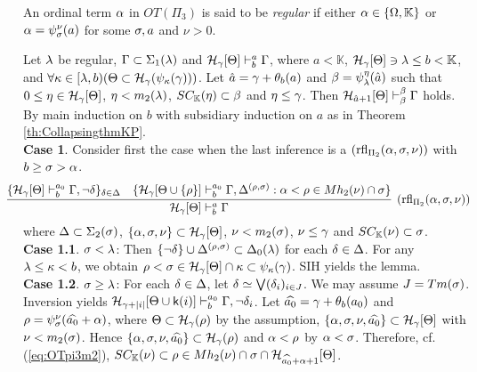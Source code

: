 \documentclass{article}
\newcommand{\mK}{\mathbb{K}}
\begin{document}
An ordinal term $\alpha$ in $OT(\Pi_{3})$ is said to be \textit{regular} if
either $\alp\in\{\Ome,\mK\}$ or $\alpha=\psi_{\sigma}^{\nu}(a)$ for some
$\sigma,a$ and $\nu>0$.



\blem\label{lem:lowerPi2}
Let $\lambda$ be regular, $\Gamma\subset\Sigma_{1}(\lambda)$ and
${\cal H}_{\gamma}[\Theta]\vdash^{a}_{b}\Gamma$, where $a<\mK$, 
$\calh_{\gam}[\Tht]\ni\lam\leq b<\mK$, and
$\forall\kappa\in[\lambda,b)(\Theta\subset{\cal H}_{\gamma}(\psi_{\kappa}(\gamma)))$.
Let $\hat{a}=\gamma+\theta_{b}(a)$ and $\beta=\psi^{\eta}_{\lambda}(\hat{a})$ such that
$0\leq\eta\in{\cal H}_{\gamma}[\Theta]$, $\eta<m_{2}(\lambda)$, $SC_{\mK}(\eta)\subset\bet$ and $\eta\leq\gamma$.
Then
${\cal H}_{\hat{a}+1}[\Theta]\vdash^{\beta}_{\beta}\Gamma$ holds.
\elem
\bprf 
By main induction on $b$ with subsidiary induction on $a$ as in Theorem \ref{th:CollapsingthmKP}.
\\
\textbf{Case 1}.
Consider first the case when the last inference is a 
$({\rm rfl}_{\Pi_{2}}(\alpha,\sigma,\nu))$ with $b\geq\sigma>\alpha$.
{\small
\[
\hspace{-5mm}
\infer[({\rm rfl}_{\Pi_{2}}(\alp,\sig,\nu))]{
\calh_{\gam}[\Tht]\vdash^{a}_{b}\Gam}
{
\{
\mathcal{H}_{\gam}[\Tht]\vdash^{a_{0}}_{b}\Gamma, \lnot\del
\}_{\del\in\Del}
&
\{
\mathcal{H}_{\gam}[\Tht\cup\{\rho\}]\vdash^{a_{0}}_{b}\Gamma, 
\Del^{(\rho,\sig)}: \alp<\rho\in Mh_{2}(\nu)\cap \sig\}
}
\]
}
where $\Delta\subset\Sigma_{2}(\sigma)$, 
$\{\alpha,\sigma,\nu\}\subset{\cal H}_{\gamma}[\Theta]$,
$\nu<
m_{2}(\sigma)$, $\nu\leq\gamma$ and
$SC_{\mK}(\nu)\subset\sig$.
\\
\textbf{Case 1.1}. $\sigma<\lambda$:
Then $\{\lnot\delta\}\cup\Delta^{(\rho,\sigma)}\subset\Delta_{0}(\lambda)$ for each $\delta\in\Delta$.
For any $\lambda\leq\kappa<b$, we obtain $\rho<\sigma\in\mathcal{H}_{\gamma}[\Theta]\cap\kappa\subset\psi_{\kappa}(\gamma)$.
SIH yields the lemma.
\\
\textbf{Case 1.2}. $\sigma\geq\lambda$:
For each $\delta\in\Delta$, let $\delta\simeq\bigvee(\delta_{i})_{i\in J}$. We may assume
$J=Tm(\sigma)$.
Inversion yields $\mathcal{H}_{\gamma+|i|}[\Theta\cup{\sf k}(i)]\vdash^{a_{0}}_{b}\Gamma, \lnot\delta_{i}$.
Let $\widehat{{a}_{0}}=\gamma+\theta_{b}(a_{0})$ and
$\rho=\psi_{\sigma}^{\nu}(\widehat{{a}_{0}}+\alpha)$,
where $\Theta\subset{\cal H}_{\gamma}(\rho)$ by the assumption,
$\{\alpha,\sigma,\nu,\widehat{{a}_{0}}\}\subset{\cal H}_{\gamma}[\Theta]$ with $\nu<m_{2}(\sigma)$.
Hence 
$\{\alpha,\sigma,\nu,\widehat{{a}_{0}}\}\subset{\cal H}_{\gamma}(\rho)$ and 
$\alpha<\rho$ by $\alpha<\sigma$.
Therefore, cf.\,(\ref{eq:OTpi3m2}), $SC_{\mK}(\nu)\subset\rho\in Mh_{2}(\nu)\cap\sig\cap\calh_{\widehat{a_{0}}+\alp+1}[\Tht]$.
\end{document}
